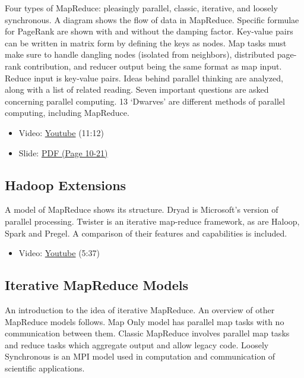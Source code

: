 Four types of MapReduce: pleasingly parallel, classic, iterative, and
loosely synchronous. A diagram shows the flow of data in MapReduce.
Specific formulae for PageRank are shown with and without the damping
factor. Key-value pairs can be written in matrix form by defining the
keys as nodes. Map tasks must make sure to handle dangling nodes
(isolated from neighbors), distributed page-rank contribution, and
reducer output being the same format as map input. Reduce input is
key-value pairs. Ideas behind parallel thinking are analyzed, along with
a list of related reading. Seven important questions are asked
concerning parallel computing. 13 `Dwarves' are different methods of
parallel computing, including MapReduce.

\begin{itemize}
\tightlist
\item
  Video: \href{https://www.youtube.com/watch?v=ISJp7TUzo1s}{Youtube}
  (11:12)
\end{itemize}

\begin{itemize}
\tightlist
\item
  Slide:
  \href{https://drive.google.com/open?id=0B88HKpainTSfWFpEZGxqSWRTYms}{PDF
  (Page 10-21)}
\end{itemize}

\subsection{Hadoop Extensions}\label{hadoop-extensions}

A model of MapReduce shows its structure. Dryad is Microsoft's version
of parallel processing. Twister is an iterative map-reduce framework, as
are Haloop, Spark and Pregel. A comparison of their features and
capabilities is included.

\begin{itemize}
\tightlist
\item
  Video: \href{https://www.youtube.com/watch?v=gS7TImRZZ1g}{Youtube}
  (5:37)
\end{itemize}

\subsection{Iterative MapReduce
Models}\label{iterative-mapreduce-models}

An introduction to the idea of iterative MapReduce. An overview of other
MapReduce models follows. Map Only model has parallel map tasks with no
communication between them. Classic MapReduce involves parallel map
tasks and reduce tasks which aggregate output and allow legacy code.
Loosely Synchronous is an MPI model used in computation and
communication of scientific applications.

